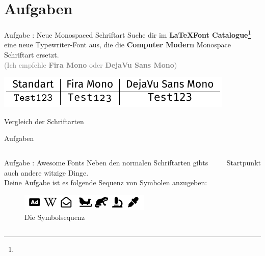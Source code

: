 \documentclass[14pt,aspectratio=169]{beamer}
\begin{document}

\section*{Aufgaben}
\sectionframe


\begin{frame}{\insertsection}
    \begin{alertblock}{Aufgabe \aufgabennummer: \quad Neue Monospaced Schriftart}
        Suche dir im \textbf{\LaTeX  Font Catalogue}\footnote{\fontcalatogue} eine neue
        Typewriter-Font aus, die die \textbf{Computer Modern} Monospace Schriftart
        ersetzt. \\
        \textcolor{gray}{(Ich empfehle \textbf{Fira Mono} oder \textbf{DejaVu Sans Mono})}
        
        \begin{table}
            \includegraphics[width=.6\textwidth]{pictures/monospaced.pdf}
            \caption{Vergleich der Schriftarten}
        \end{table}
        
    \end{alertblock}
\end{frame}


\begin{frame}{Aufgaben}
    \begin{columns}
            
        \begin{alertblock}{Aufgabe \aufgabennummer: \quad Awesome Fonts \small\faGrinHearts[regular]}
            Neben den normalen Schriftarten gibts auch andere witzige Dinge.\\[1em]        
            Deine Aufgabe ist es folgende Sequenz von Symbolen anzugeben:
            
            \begin{figure}
                \includegraphics[width=.9\textwidth]{pictures/awesome.pdf}
                \caption{Die Symbolsequenz}
            \end{figure}
        
            \vspace{-1em}
        \end{alertblock}
            
            
        \centering
        \large Startpunkt
        \material[height=.7\textwidth]{\ctanFontAwesome}
    \end{columns}
\end{frame}
\end{document}

